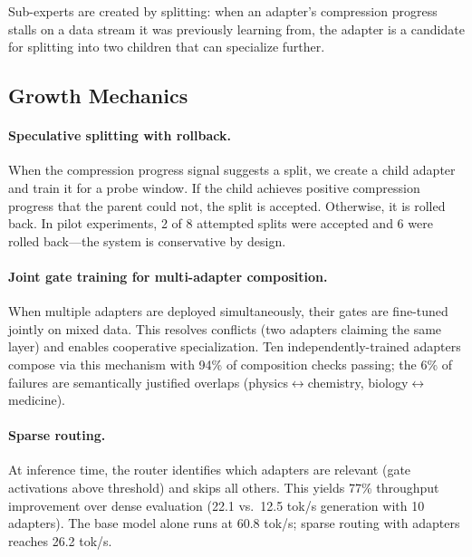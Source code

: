 \documentclass{article}
\begin{document}
Sub-experts are created by splitting: when an adapter's compression
progress stalls on a data stream it was previously learning from, the
adapter is a candidate for splitting into two children that can
specialize further.

\subsection{Growth Mechanics}
\label{sec:growth}

\paragraph{Speculative splitting with rollback.}
When the compression progress signal suggests a split, we create a
child adapter and train it for a probe window. If the child achieves
positive compression progress that the parent could not, the split is
accepted. Otherwise, it is rolled back. In pilot experiments, 2 of 8
attempted splits were accepted and 6 were rolled back---the system
is conservative by design.


\paragraph{Joint gate training for multi-adapter composition.}
When multiple adapters are deployed simultaneously, their gates are
fine-tuned jointly on mixed data. This resolves conflicts (two adapters
claiming the same layer) and enables cooperative specialization. Ten
independently-trained adapters compose via this mechanism with 94\% of
composition checks passing; the 6\% of failures are semantically
justified overlaps (physics$\leftrightarrow$chemistry,
biology$\leftrightarrow$medicine).

\paragraph{Sparse routing.}
At inference time, the router identifies which adapters are relevant
(gate activations above threshold) and skips all others. This yields
77\% throughput improvement over dense evaluation (22.1 vs.\ 12.5 tok/s
generation with 10 adapters). The base model alone runs at 60.8 tok/s;
sparse routing with adapters reaches 26.2 tok/s.
\end{document}

